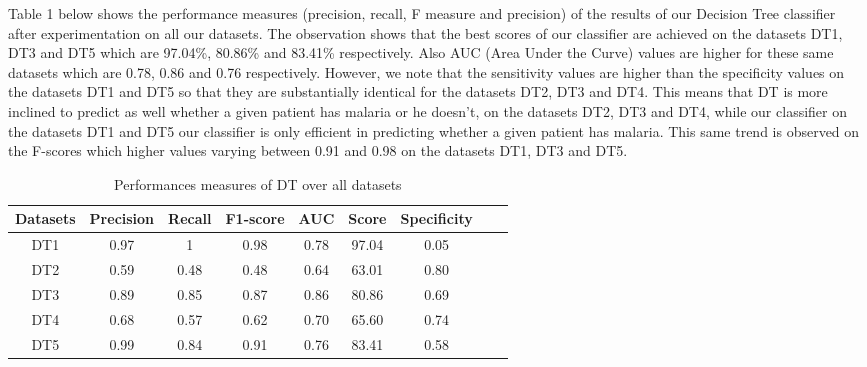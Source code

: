 Table 1  below shows the performance measures (precision, recall, F measure and precision) of the results of our Decision Tree classifier after experimentation on all our datasets. The observation shows that the best scores of our classifier are achieved on the datasets DT1, DT3 and DT5 which are 97.04\%, 80.86\% and 83.41\% respectively. Also AUC (Area Under the Curve) values are higher for these same datasets which are 0.78, 0.86 and 0.76 respectively. However, we note that the sensitivity values are higher than the specificity values on the datasets DT1 and DT5 so that they are substantially identical for the datasets DT2, DT3 and DT4. This means that DT is more inclined to predict as well whether a given patient has malaria or he doesn’t, on the datasets DT2, DT3 and DT4, while our classifier on the datasets DT1 and DT5 our classifier is only efficient in predicting whether a given patient has malaria. This same trend is observed on the F-scores which higher values varying between 0.91 and 0.98 on the datasets DT1, DT3 and DT5.

\begin{table}[!ht]
\centering
\begin{tabular}{*{7}{c}l r}
  \toprule
  \textbf{Datasets} & \textbf{Precision} & \textbf{Recall} & \textbf{F1-score}&\textbf{AUC} &\textbf{Score}&\textbf{Specificity}\\
   \midrule
  DT1 &0.97  & 1   & 0.98 & 0.78 & 97.04 & 0.05 \\
  DT2 & 0.59 &0.48 &0.48  &0.64  &63.01  &0.80\\
  DT3 &0.89  &0.85 &0.87  &0.86  &80.86  &0.69\\
  DT4 &0.68  &0.57 &0.62  &0.70  &65.60  &0.74\\
  DT5 &0.99  &0.84 &0.91  &0.76  &83.41  &0.58\\

  
    \bottomrule
\end{tabular}
\caption{Performances measures of DT over all datasets}\label{perf-measure-dt1}
\end{table}
